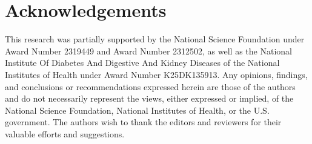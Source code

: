 \documentclass[]{article}
\begin{document}
\section*{Acknowledgements}
This research was partially supported by the National Science Foundation under Award Number 2319449 and Award Number 2312502, as well as the National Institute Of Diabetes And Digestive And Kidney Diseases of the National Institutes of Health under Award Number K25DK135913. Any opinions, findings, and conclusions or recommendations expressed herein are those of the authors and do not necessarily represent the views, either expressed or implied, of the National Science Foundation, National Institutes of Health, or the U.S. government.
The authors wish to thank the editors and reviewers for their valuable efforts and suggestions.  


 



\end{document}
